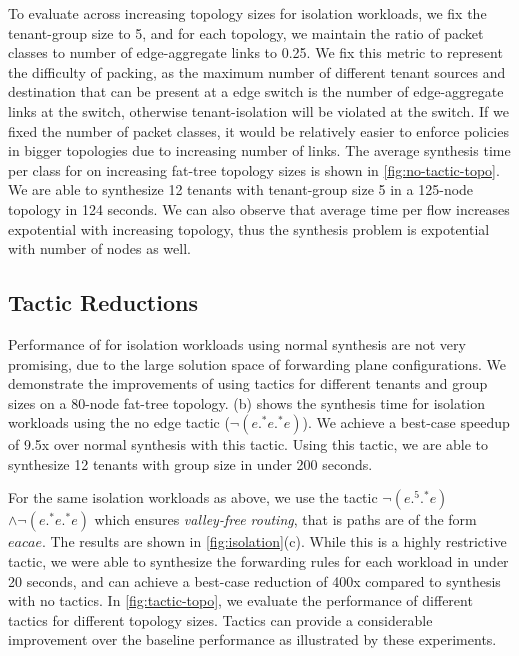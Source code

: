 To evaluate \Name across increasing topology sizes for isolation workloads, 
we fix the tenant-group size to 5, and for each topology, we maintain
 the ratio of packet classes to number of edge-aggregate links to 0.25. 
 We fix this metric to represent the difficulty of packing, as the maximum number 
 of different tenant sources and destination that can be present at a edge switch
 is the number of edge-aggregate links at the switch, otherwise tenant-isolation
 will be violated at the switch. If we fixed the number of packet classes, it would 
 be relatively easier to enforce policies in bigger topologies due to increasing 
 number of links. The average synthesis time per class for
 on increasing fat-tree topology sizes is shown in \cref{fig:no-tactic-topo}. 
 We are able to synthesize 12 tenants with tenant-group size 5 in a 125-node topology in 124 seconds. 
  We can also observe that average time per flow increases expotential 
  with increasing topology, thus the synthesis problem is expotential with number of nodes as well. 
		

\subsection{Tactic Reductions}
Performance of \Name for isolation workloads using normal synthesis are not 
very promising, due to the large solution space of forwarding plane configurations. We 
demonstrate the improvements of using tactics for different tenants and group sizes on a 
80-node fat-tree topology.
(b) shows the synthesis time for isolation workloads using the no edge tactic 
($\neg(e .^* e .^* e)$). We achieve a best-case speedup of 9.5x over normal synthesis with this tactic. 
Using this tactic, we are able to synthesize 12 tenants with group size in under 200
seconds.

For the same isolation workloads as above, we use the tactic $\neg (e .^5 .^* e)$ $\wedge \neg (e .^* e .^* e)$
which ensures {\em valley-free routing}, that is paths are of the form $eacae$. 
The results are shown in \cref{fig:isolation}(c). 
While this is a highly
restrictive tactic, we were able to synthesize the forwarding rules for each workload in under 20 seconds, 
and can achieve a best-case reduction of 400x compared to synthesis with no tactics. In \cref{fig:tactic-topo},
we evaluate the performance of different tactics for different topology sizes. Tactics can provide 
a considerable improvement over the baseline performance as illustrated by these experiments. 


